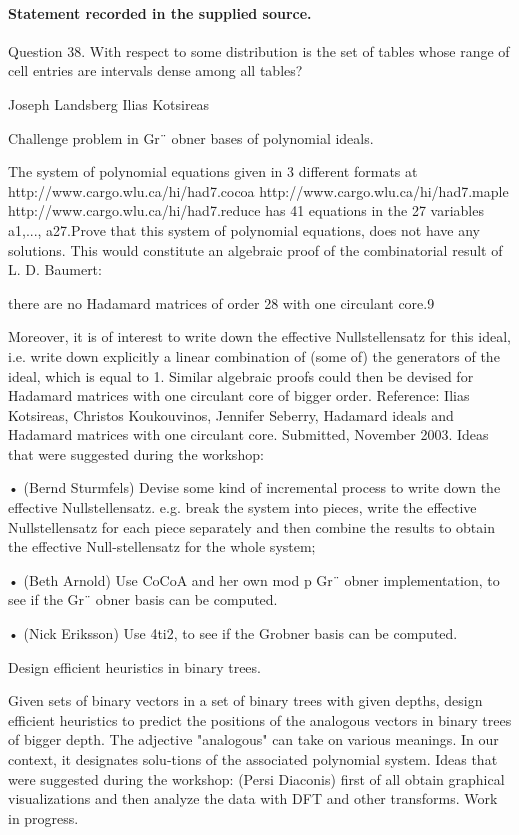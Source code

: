 \documentclass[11pt]{article}
\begin{document}
\paragraph{Statement recorded in the supplied source.}
Question 38. With respect to some distribution is the set of tables whose range of cell entries are intervals dense among all tables?

Joseph Landsberg Ilias Kotsireas

Challenge problem in Gr¨ obner bases of polynomial ideals.

The system of polynomial equations given in 3 different formats at http://www.cargo.wlu.ca/hi/had7.cocoa http://www.cargo.wlu.ca/hi/had7.maple http://www.cargo.wlu.ca/hi/had7.reduce has 41 equations in the 27 variables a1,..., a27.Prove that this system of polynomial equations, does not have any solutions. This would constitute an algebraic proof of the combinatorial result of L. D. Baumert:

there are no Hadamard matrices of order 28 with one circulant core.9

Moreover, it is of interest to write down the effective Nullstellensatz for this ideal, i.e. write down explicitly a linear combination of (some of) the generators of the ideal, which is equal to 1. Similar algebraic proofs could then be devised for Hadamard matrices with one circulant core of bigger order. Reference: Ilias Kotsireas, Christos Koukouvinos, Jennifer Seberry, Hadamard ideals and Hadamard matrices with one circulant core. Submitted, November 2003. Ideas that were suggested during the workshop:

• (Bernd Sturmfels) Devise some kind of incremental process to write down the effective Nullstellensatz. e.g. break the system into pieces, write the effective Nullstellensatz for each piece separately and then combine the results to obtain the effective Null-stellensatz for the whole system;

• (Beth Arnold) Use CoCoA and her own mod p Gr¨ obner implementation, to see if the Gr¨ obner basis can be computed.

• (Nick Eriksson) Use 4ti2, to see if the Grobner basis can be computed.

Design efficient heuristics in binary trees.

Given sets of binary vectors in a set of binary trees with given depths, design efficient heuristics to predict the positions of the analogous vectors in binary trees of bigger depth. The adjective "analogous" can take on various meanings. In our context, it designates solu-tions of the associated polynomial system. Ideas that were suggested during the workshop: (Persi Diaconis) first of all obtain graphical visualizations and then analyze the data with DFT and other transforms. Work in progress.
\end{document}
